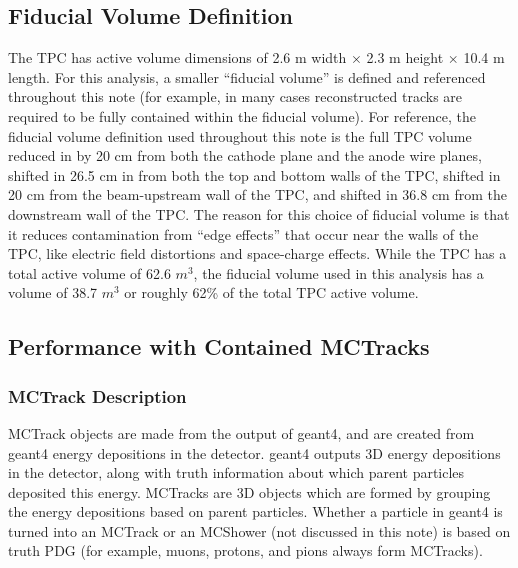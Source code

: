 \subsection{Fiducial Volume Definition}\label{fidvol_section}
The {\ub} TPC has active volume dimensions of 2.6 m width $\times$ 2.3 m height $\times$ 10.4 m length. For this analysis, a smaller ``fiducial volume'' is defined and referenced throughout this note (for example, in many cases reconstructed tracks are required to be fully contained within the fiducial volume). For reference, the fiducial volume definition used throughout this note is the full TPC volume reduced in by 20 cm from both the cathode plane and the anode wire planes, shifted in 26.5 cm in from both the top and bottom walls of the TPC, shifted in 20 cm from the beam-upstream wall of the TPC, and shifted in 36.8 cm from the downstream wall of the TPC. The reason for this choice of fiducial volume is that it reduces contamination from ``edge effects'' that occur near the walls of the TPC, like electric field distortions and space-charge effects. While the TPC has a total active volume of 62.6 $m^3$, the fiducial volume used in this analysis has a volume of 38.7 $m^3$ or roughly 62\% of the total TPC active volume.









\subsection{Performance with Contained {\sc MCTracks}}\label{MCBNBMCTrack_performance_section}


\subsubsection{MCTrack Description}\label{MCTrack_section}
{\sc MCTrack} objects are made from the output of {\sc geant}4, and are created from {\sc geant}4 energy depositions in the detector. {\sc geant}4 outputs 3D energy depositions in the detector, along with truth information about which parent particles deposited this energy. {\sc MCTracks} are 3D objects which are formed by grouping the energy depositions based on parent particles. Whether a particle in {\sc geant}4 is turned into an {\sc MCTrack} or an {\sc MCShower} (not discussed in this note) is based on truth PDG (for example, muons, protons, and pions always form {\sc MCTracks}).\\

